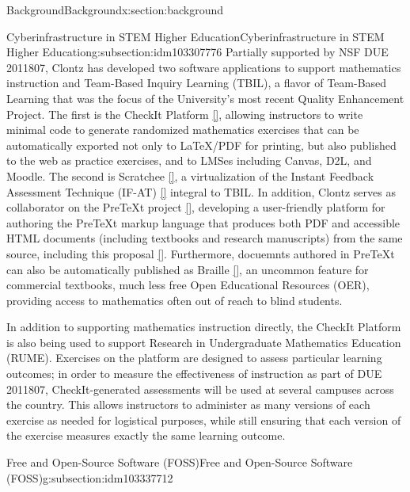 \documentclass[oneside,10pt,]{article}
\newcommand{\xreffont}{\relax}
\begin{document}
\begin{sectionptx}{Background}{}{Background}{}{}{x:section:background}
\begin{subsectionptx}{Cyberinfrastructure in STEM Higher Education}{}{Cyberinfrastructure in STEM Higher Education}{}{}{g:subsection:idm103307776}
Partially supported by NSF DUE 2011807, Clontz has developed two software applications to support mathematics instruction and Team-Based Inquiry Learning (TBIL), a flavor of Team-Based Learning that was the focus of the University's most recent Quality Enhancement Project. The first is the CheckIt Platform \hyperlink{x:biblio:biblio-checkit}{[{\xreffont 8}]}, allowing instructors to write minimal code to generate randomized mathematics exercises that can be automatically exported not only to LaTeX\slash{}PDF for printing, but also published to the web as practice exercises, and to LMSes including Canvas, D2L, and Moodle. The second is Scratchee \hyperlink{x:biblio:biblio-scratchee}{[{\xreffont 10}]}, a virtualization of the Instant Feedback Assessment Technique (IF-AT) \hyperlink{x:biblio:biblio-ifat}{[{\xreffont 12}]} integral to TBIL. In addition, Clontz serves as collaborator on the PreTeXt project \hyperlink{x:biblio:biblio-pretext}{[{\xreffont 5}]}, developing a user-friendly platform for authoring the PreTeXt markup language that produces both PDF and accessible HTML documents (including textbooks and research manuscripts) from the same source, including this proposal \hyperlink{x:biblio:biblio-repo}{[{\xreffont 11}]}. Furthermore, docuemnts authored in PreTeXt can also be automatically published as Braille \hyperlink{x:biblio:biblio-braille}{[{\xreffont 2}]}, an uncommon feature for commercial textbooks, much less free Open Educational Resources (OER), providing access to mathematics often out of reach to blind students.%
\par
In addition to supporting mathematics instruction directly, the CheckIt Platform is also being used to support Research in Undergraduate Mathematics Education (RUME). Exercises on the platform are designed to assess particular learning outcomes; in order to measure the effectiveness of instruction as part of DUE 2011807, CheckIt-generated assessments will be used at several campuses across the country. This allows instructors to administer as many versions of each exercise as needed for logistical purposes, while still ensuring that each version of the exercise measures exactly the same learning outcome.%
\end{subsectionptx}
%
%
\typeout{************************************************}
\typeout{************************************************}
%
\begin{subsectionptx}{Free and Open-Source Software (FOSS)}{}{Free and Open-Source Software (FOSS)}{}{}{g:subsection:idm103337712}

\end{subsectionptx}
\end{sectionptx}
\end{document}
